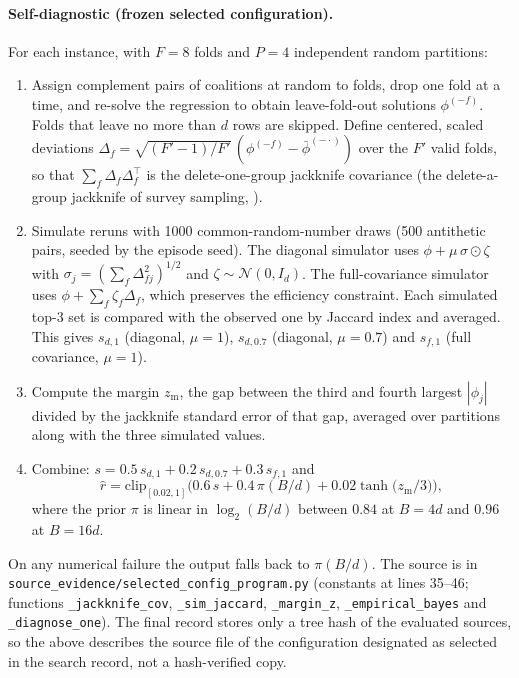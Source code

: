 \documentclass{article}
\newcommand{\rhat}{\hat r}
\begin{document}
\paragraph{Self-diagnostic (frozen selected configuration).}
For each instance, with $F=8$ folds and $P=4$ independent random partitions:
\begin{enumerate}
\item Assign complement pairs of coalitions at random to folds, drop one fold at a time, and re-solve the regression to obtain leave-fold-out solutions $\phi^{(-f)}$. Folds that leave no more than $d$ rows are skipped. Define centered, scaled deviations $\Delta_f=\sqrt{(F'-1)/F'}\,(\phi^{(-f)}-\bar\phi^{(-\cdot)})$ over the $F'$ valid folds, so that $\sum_f\Delta_f\Delta_f^{\top}$ is the delete-one-group jackknife covariance (the delete-a-group jackknife of survey sampling, \citealp{Kott2001Using}).
\item Simulate reruns with 1000 common-random-number draws (500 antithetic pairs, seeded by the episode seed). The diagonal simulator uses $\phi+\mu\,\sigma\odot\zeta$ with $\sigma_j=(\sum_f\Delta_{fj}^2)^{1/2}$ and $\zeta\sim\mathcal N(0,I_d)$. The full-covariance simulator uses $\phi+\sum_f\zeta_f\Delta_f$, which preserves the efficiency constraint. Each simulated top-3 set is compared with the observed one by Jaccard index and averaged. This gives $s_{d,1}$ (diagonal, $\mu=1$), $s_{d,0.7}$ (diagonal, $\mu=0.7$) and $s_{f,1}$ (full covariance, $\mu=1$).
\item Compute the margin $z_{\mathrm{m}}$, the gap between the third and fourth largest $|\phi_j|$ divided by the jackknife standard error of that gap, averaged over partitions along with the three simulated values.
\item Combine: $s=0.5\,s_{d,1}+0.2\,s_{d,0.7}+0.3\,s_{f,1}$ and
\begin{equation}
\rhat=\mathrm{clip}_{[0.02,1]}\Big(0.6\,s+0.4\,\pi(B/d)+0.02\tanh\big(z_{\mathrm m}/3\big)\Big),
\end{equation}
where the prior $\pi$ is linear in $\log_2(B/d)$ between $0.84$ at $B=4d$ and $0.96$ at $B=16d$.
\end{enumerate}
On any numerical failure the output falls back to $\pi(B/d)$. The source is in \texttt{source\_evidence/selected\_config\_program.py} (constants at lines 35--46; functions \texttt{\_jackknife\_cov}, \texttt{\_sim\_jaccard}, \texttt{\_margin\_z}, \texttt{\_empirical\_bayes} and \texttt{\_diagnose\_one}). The final record stores only a tree hash of the evaluated sources, so the above describes the source file of the configuration designated as selected in the search record, not a hash-verified copy.
\end{document}
